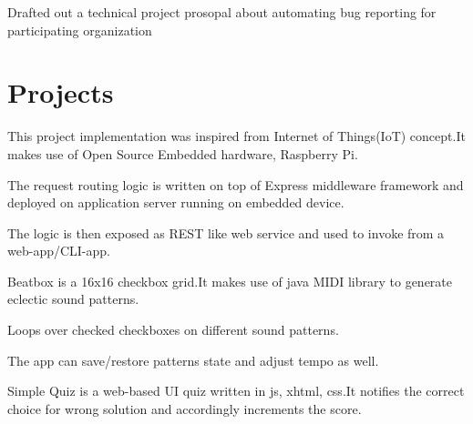 \documentclass[hidelinks]{deedy-resume-openfont}
\renewcommand{\sectionsep}[0]{\vspace{8pt}}
\begin{document}
\begin{minipage}[t]{0.66\textwidth}
\begin{tightemize}
\item Drafted out a technical project prosopal about automating bug reporting
  for participating organization \href{http://code.timvideos.us/home/}{}
\end{tightemize}
\sectionsep


\section{Projects}
\descript{}
\begin{tightemize}
\item This project implementation was inspired from Internet of Things(IoT)
  concept.It makes use of Open Source Embedded hardware, Raspberry Pi.
\item The request routing logic is written on top of Express middleware
  framework and deployed on application server running on embedded device.
\item The logic is then exposed as REST like web service and used to invoke 
  from a web-app/CLI-app.
\end{tightemize}
\sectionsep

\descript{}
\begin{tightemize}
\item Beatbox is a 16x16 checkbox grid.It makes use of java MIDI library to
generate eclectic sound patterns.
\item Loops over checked checkboxes on different sound patterns.
\item The app can save/restore patterns state and adjust tempo as well.
\end{tightemize}
\sectionsep

\descript{}
\begin{tightemize}
\item Simple Quiz is a web-based UI quiz written in js, xhtml, css.It notifies
  the correct choice for wrong solution and accordingly increments the score.
\end{tightemize}
\sectionsep


\end{minipage}
\end{document}
